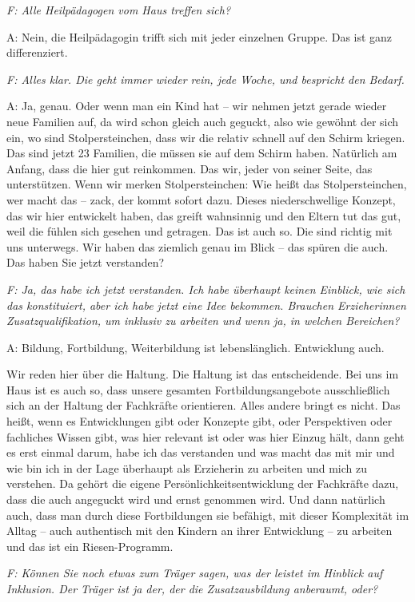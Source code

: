 \begin{linenumbers}
\emph{F: Alle Heilpädagogen vom Haus treffen sich?} 

A: Nein, die Heilpädagogin trifft sich mit jeder einzelnen Gruppe. Das ist ganz differenziert.

\emph{F: Alles klar. Die geht immer wieder rein, jede Woche, und bespricht den Bedarf.} 

A: Ja, genau. Oder wenn man ein Kind hat -- wir nehmen jetzt gerade wieder neue Familien auf, da wird schon gleich auch geguckt, also wie gewöhnt der sich ein, wo sind Stolpersteinchen, dass wir die relativ schnell auf den Schirm kriegen. Das sind jetzt 23 Familien, die müssen sie auf dem Schirm haben. Natürlich am Anfang, dass die hier gut reinkommen. Das wir, jeder von seiner Seite, das unterstützen. Wenn wir merken Stolpersteinchen: Wie heißt das Stolpersteinchen, wer macht das -- zack, der kommt sofort dazu.
Dieses niederschwellige Konzept, das wir hier entwickelt haben, das greift wahnsinnig und den Eltern tut das gut, weil die fühlen sich gesehen und getragen. Das ist auch so. Die sind richtig mit uns unterwegs. Wir haben das ziemlich genau im Blick -- das spüren die auch. Das haben Sie jetzt verstanden?

\emph{F: Ja, das habe ich jetzt verstanden. Ich habe überhaupt keinen Einblick, wie sich das konstituiert, aber ich habe jetzt eine Idee bekommen. Brauchen Erzieherinnen Zusatzqualifikation, um inklusiv zu arbeiten und wenn ja, in welchen Bereichen?}

A: Bildung, Fortbildung, Weiterbildung ist lebenslänglich. Entwicklung auch. 

Wir reden hier über die Haltung. Die Haltung ist das entscheidende. Bei uns im Haus ist es auch so, dass unsere gesamten Fortbildungsangebote ausschließlich sich an der Haltung der Fachkräfte orientieren. Alles andere bringt es nicht. Das heißt, wenn es Entwicklungen gibt oder Konzepte gibt, oder Perspektiven oder fachliches Wissen gibt, was hier relevant ist oder was hier Einzug hält, dann geht es erst einmal darum, habe ich das verstanden und was macht das mit mir und wie bin ich in der Lage überhaupt als Erzieherin zu arbeiten und mich zu verstehen. Da gehört die eigene Persönlichkeitsentwicklung der Fachkräfte dazu, dass die auch angeguckt wird und ernst genommen wird. Und dann natürlich auch, dass man durch diese Fortbildungen sie befähigt, mit dieser Komplexität im Alltag -- auch authentisch mit den Kindern an ihrer Entwicklung -- zu arbeiten und das ist ein Riesen-Programm. 

\emph{F: Können Sie noch etwas zum Träger sagen, was der leistet im Hinblick auf Inklusion. Der Träger ist ja der, der die Zusatzausbildung anberaumt, oder?}


\end{linenumbers}
